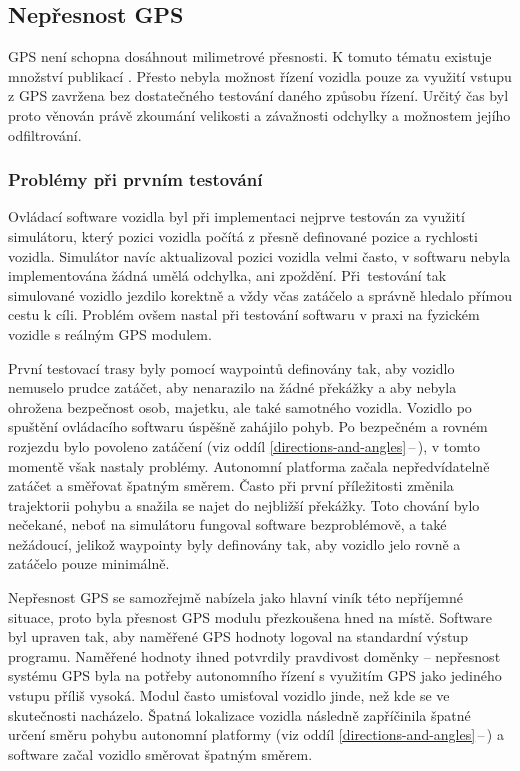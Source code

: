 \documentclass[czech, bachelor]{diploma}
\newcommand{\peteref}[1]{\ref{#1}\,--\,\nameref{#1}}
\begin{document}
\subsection{Nepřesnost GPS} \label{gps-inaccuracy}

GPS není schopna dosáhnout milimetrové přesnosti. K tomuto tématu existuje množství publikací \cite{gps-inaccuracy-source}. Přesto
nebyla možnost řízení vozidla pouze za využití vstupu z GPS zavržena bez dostatečného testování daného způsobu řízení. Určitý čas
byl proto věnován právě zkoumání velikosti a závažnosti odchylky a možnostem jejího odfiltrování.

\subsubsection{Problémy při prvním testování}

Ovládací software vozidla byl při implementaci nejprve testován za využití simulátoru, který pozici vozidla počítá z přesně
definované pozice a rychlosti vozidla. Simulátor navíc aktualizoval pozici vozidla velmi často, v softwaru nebyla implementována
žádná umělá odchylka, ani zpoždění. Při~testování tak simulované vozidlo jezdilo korektně a vždy včas zatáčelo a správně hledalo
přímou cestu k cíli. Problém ovšem nastal při testování softwaru v praxi na fyzickém vozidle s reálným GPS modulem.

První testovací trasy byly pomocí waypointů definovány tak, aby vozidlo nemuselo prudce zatáčet, aby nenarazilo na žádné překážky
a aby nebyla ohrožena bezpečnost osob, majetku, ale také samotného vozidla. Vozidlo po spuštění ovládacího softwaru úspěšně
zahájilo pohyb. Po bezpečném a rovném rozjezdu bylo povoleno zatáčení (viz oddíl \peteref{directions-and-angles}), v tomto
momentě však nastaly problémy. Autonomní platforma začala nepředvídatelně zatáčet a směřovat špatným směrem. Často při první
příležitosti změnila trajektorii pohybu a snažila se najet do nejbližší překážky. Toto chování bylo nečekané, neboť na simulátoru
fungoval software bezproblémově, a také nežádoucí, jelikož waypointy byly definovány tak, aby vozidlo jelo rovně a zatáčelo pouze
minimálně.

Nepřesnost GPS se samozřejmě nabízela jako hlavní viník této nepříjemné situace, proto byla přesnost GPS modulu přezkoušena hned
na místě. Software byl upraven tak, aby naměřené GPS hodnoty logoval na standardní výstup programu. Naměřené hodnoty ihned
potvrdily pravdivost doměnky -- nepřesnost systému GPS byla na potřeby autonomního řízení s využitím GPS jako jediného vstupu
příliš vysoká. Modul často umisťoval vozidlo jinde, než kde se ve skutečnosti nacházelo. Špatná lokalizace vozidla následně
zapříčinila špatné určení směru pohybu autonomní platformy (viz oddíl \peteref{directions-and-angles}) a software začal vozidlo
směrovat špatným směrem.
\end{document}
